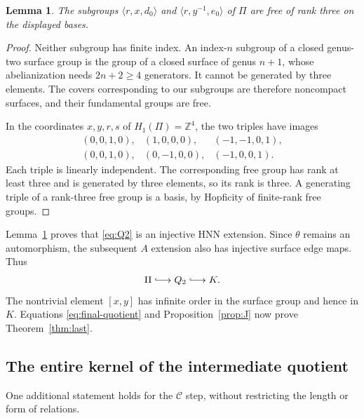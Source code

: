 \documentclass[11pt]{amsart}
\newtheorem{lemma}[theorem]{Lemma}
\theoremstyle{definition}
\theoremstyle{remark}
\newcommand{\Z}{\mathbb Z}
\begin{document}
\begin{lemma}\label{lem:rankthree}
The subgroups $\langle r,x,d_0\rangle$ and
$\langle r,y^{-1},e_0\rangle$ of $\Pi$ are free of rank three
on the displayed bases.
\end{lemma}
\begin{proof}
Neither subgroup has finite index. An index-$n$ subgroup of a
closed genus-two surface group is the group of a closed surface
of genus $n+1$, whose abelianization needs $2n+2\ge4$ generators.
It cannot be generated by three elements. The covers corresponding
to our subgroups are therefore noncompact surfaces, and their
fundamental groups are free.

In the coordinates $x,y,r,s$ of $H_1(\Pi)=\Z^4$, the two
triples have images
\[
 \begin{array}{lll}
 (0,0,1,0),&(1,0,0,0),&(-1,-1,0,1),\\
 (0,0,1,0),&(0,-1,0,0),&(-1,0,0,1).
 \end{array}
\]
Each triple is linearly independent. The corresponding free group
has rank at least three and is generated by three elements, so its
rank is three. A generating triple of a rank-three free group is
a basis, by Hopficity of finite-rank free groups.
\end{proof}

Lemma~\ref{lem:rankthree} proves that \eqref{eq:Q2} is an
injective HNN extension. Since $\theta$ remains an automorphism,
the subsequent $A$ extension also has injective surface edge maps.
Thus
\begin{equation}\label{eq:surface-injection}
                         \Pi\lhook\joinrel\longrightarrow Q_2
                            \lhook\joinrel\longrightarrow K.
\end{equation}
The nontrivial element $[x,y]$ has infinite order in the surface
group and hence in $K$. Equations \eqref{eq:final-quotient} and
Proposition~\ref{prop:J} now prove Theorem~\ref{thm:last}.

\subsection{The entire kernel of the intermediate quotient}
One additional statement holds for the $\mathcal C$ step, without
restricting the length or form of relations.
\end{document}
